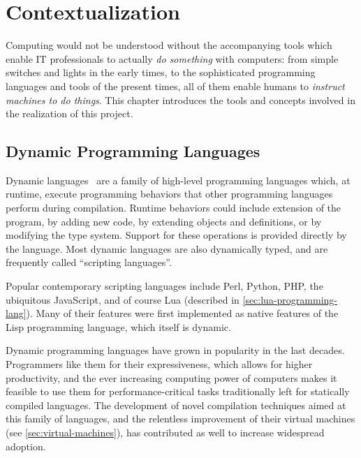 
\cleardoublepage
\setchaptertoc
\chapter{Contextualization}

Computing would not be understood without the accompanying tools which enable
IT professionals to actually \emph{do something} with computers: from simple
switches and lights in the early times, to the sophisticated programming
languages and tools of the present times, all of them enable humans to
\emph{instruct machines to do things}. This chapter introduces the tools and
concepts involved in the realization of this project.
\afterintro


\section{Dynamic Programming Languages}

Dynamic languages~\cite{tratt-dynamic-langs} are a family of high-level
programming languages which, at runtime, execute programming behaviors that
other programming languages perform during compilation. Runtime behaviors
could include extension of the program, by adding new code, by extending
objects and definitions, or by modifying the type system. Support for these
operations is provided directly by the language. Most dynamic languages are
also dynamically typed, and are frequently called “scripting languages”.

Popular contemporary scripting languages include Perl, Python, PHP, the
ubiquitous JavaScript, and of course Lua (described in
\autoref{sec:lua-programming-lang}). Many of their features were first
implemented as native features of the Lisp programming language, which itself
is dynamic.

Dynamic programming languages have grown in popularity in the last decades.
Programmers like them for their expressiveness, which allows for higher
productivity, and the ever increasing computing power of computers makes it
feasible to use them for performance-critical tasks traditionally left for
statically compiled languages. The development of novel compilation techniques
aimed at this family of languages, and the relentless improvement of their
virtual machines (see \autoref{sec:virtual-machines}), has contributed as well
to increase widespread adoption.

